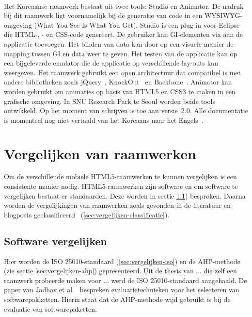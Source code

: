 \paragraph{\davinci}%
Het Koreaanse raamwerk \davinci{} bestaat uit twee tools:  \davinci{} Studio en \davinci{} Animator.
De nadruk bij dit raamwerk ligt voornamelijk bij de generatie van code in een WYSIWYG-omgeving (What You See Is What You Get).
\davinci{} Studio is een plug-in voor Eclipse die HTML-,  \js{}- en CSS-code genereert.
De gebruiker kan GI-elementen via  aan de applicatie toevoegen.
Het binden van data kan door op een visuele manier de mapping tussen GI en data weer te geven.
Het testen van de applicatie kan op een bijgeleverde emulator die de applicatie op verschillende lay-outs kan weergeven.
Het raamwerk gebruikt een open architectuur dat compatibel is met andere  bibliotheken zoals jQuery~\cite{JQuery2013a}, KnockOut~\cite{KnockOut2013} en Backbone~\cite{Backbone2013}.
\davinci{} Animator kan worden gebruikt om animaties op basis van HTML5 en CSS3 te maken in een grafische omgeving.
In SNU Research Park te Seoul worden beide tools ontwikkeld.
Op het moment van schrijven is \davinci{} toe aan versie~2.0.  
Alle documentatie is momenteel nog niet vertaald van het Koreaans naar het Engels~\cite{Incross}.

 

\section{Vergelijken van raamwerken} 
\label{sec:vergelijken-raamwerken}
Om de verschillende mobiele HTML5-raamwerken te kunnen vergelijken is een consistente manier nodig.
HTML5-raamwerken zijn software en om software te vergelijken bestaat er standaarden.
Deze worden in sectie \ref{sec:vergelijken-standaarden}) besproken.
Daarna worden de vergelijkingen van raamwerken zoals gevonden in de literatuur en blogposts geclassificeerd ~(\ref{sec:vergelijken-classificatie}).

\subsection{Software vergelijken}
\label{sec:vergelijken-standaarden}
Hier worden de ISO 25010-standaard (\ref{sec:vergelijken-iso}) en de AHP-methode (zie sectie \ref{sec:vergelijken-ahp}) gepresenteerd.  
Uit de thesis van ... die zelf een raamwerk probeerde maken voor ... werd de ISO 25010-standaard aangehaald.%
De paper van Jadhav et al.~\cite{Jadhav2009} bespreken evaluatietechnieken voor het selecteren van softwarepakketten.
Hierin staat dat de AHP-methode wijd gebruikt is bij de evaluatie van softwarepaketten.

